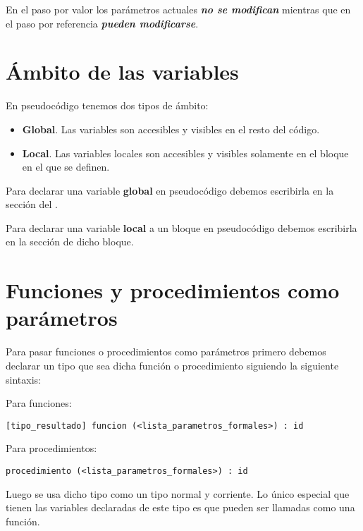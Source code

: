 \documentclass{article}
\begin{document}
En el paso por valor los parámetros actuales \textbf{\textit{no se modifican}} mientras que en el paso por referencia \textbf{\textit{pueden modificarse}}.

\section{Ámbito de las variables}

En pseudocódigo tenemos dos tipos de ámbito:

\begin{itemize}
\item \textbf{Global}. Las variables son accesibles y visibles en el resto del código.
\item \textbf{Local}. Las variables locales son accesibles y visibles solamente en el bloque en el que se definen.
\end{itemize}

Para declarar una variable \textbf{global} en pseudocódigo debemos escribirla en la sección  del .

Para declarar una variable \textbf{local} a un bloque en pseudocódigo debemos escribirla en la sección  de dicho bloque.

\section{Funciones y procedimientos como parámetros}

Para pasar funciones o procedimientos como parámetros primero debemos declarar un tipo que sea dicha función o procedimiento siguiendo la siguiente sintaxis:

Para funciones:

\begin{lstlisting}[language = pseudocodigoesp]
[tipo_resultado] funcion (<lista_parametros_formales>) : id
\end{lstlisting}

Para procedimientos:

\begin{lstlisting}[language = pseudocodigoesp]
procedimiento (<lista_parametros_formales>) : id
\end{lstlisting}

Luego se usa dicho tipo como un tipo normal y corriente. Lo único especial que tienen las variables declaradas de este tipo es que pueden ser llamadas como una función.

\pagebreak
\end{document}
